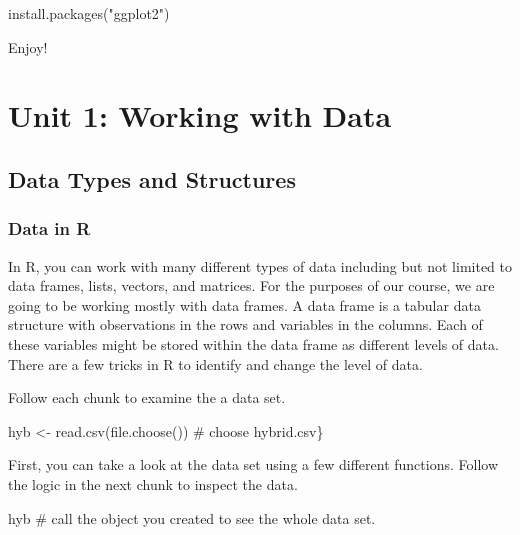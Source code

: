\documentclass[
  letterpaper,
  DIV=11,
  numbers=noendperiod]{scrreprt}
\newenvironment{Shaded}{\begin{snugshade}}{\end{snugshade}}
\newcommand{\CommentTok}[1]{\textcolor[rgb]{0.37,0.37,0.37}{#1}}
\newcommand{\FunctionTok}[1]{\textcolor[rgb]{0.28,0.35,0.67}{#1}}
\newcommand{\NormalTok}[1]{\textcolor[rgb]{0.00,0.23,0.31}{#1}}
\newcommand{\OtherTok}[1]{\textcolor[rgb]{0.00,0.23,0.31}{#1}}
\newcommand{\StringTok}[1]{\textcolor[rgb]{0.13,0.47,0.30}{#1}}
\begin{document}
\begin{Shaded}
\begin{Highlighting}[]
\FunctionTok{install.packages}\NormalTok{(}\StringTok{"ggplot2"}\NormalTok{)}
\end{Highlighting}
\end{Shaded}

Enjoy!

\part{Unit 1: Working with Data}

\chapter{Data Types and Structures}\label{data-types-and-structures}

\section{Data in R}\label{data-in-r}

In R, you can work with many different types of data including but not
limited to data frames, lists, vectors, and matrices. For the purposes
of our course, we are going to be working mostly with data frames. A
data frame is a tabular data structure with observations in the rows and
variables in the columns. Each of these variables might be stored within
the data frame as different levels of data. There are a few tricks in R
to identify and change the level of data.

Follow each chunk to examine the a data set.

\begin{Shaded}
\begin{Highlighting}[]
\NormalTok{hyb }\OtherTok{\textless{}{-}} \FunctionTok{read.csv}\NormalTok{(}\FunctionTok{file.choose}\NormalTok{()) }\CommentTok{\# choose hybrid.csv\}}
\end{Highlighting}
\end{Shaded}

First, you can take a look at the data set using a few different
functions. Follow the logic in the next chunk to inspect the data.

\begin{Shaded}
\begin{Highlighting}[]
\NormalTok{hyb }\CommentTok{\# call the object you created to see the whole data set.  }
\end{Highlighting}
\end{Shaded}
\end{document}
